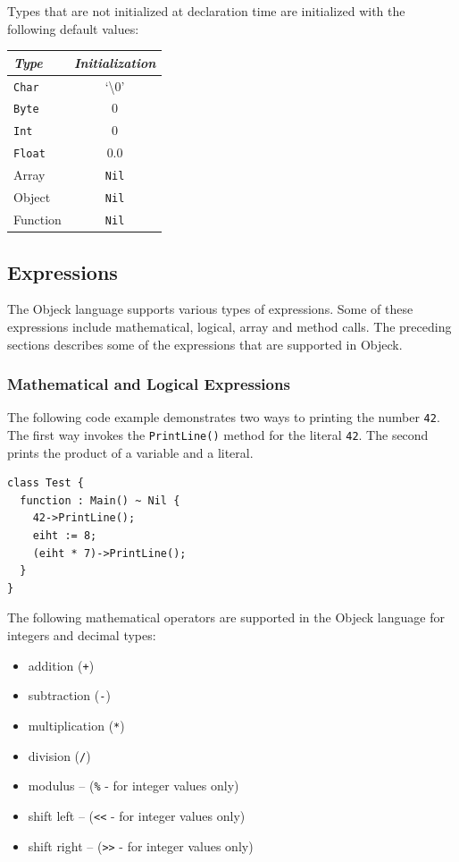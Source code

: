 \documentclass[11pt]{article}
\begin{document}
Types that are not initialized at declaration time are initialized
with the following default values:

\vspace{\baselineskip}
\begin{center}
  \begin{tabular}{| l | c |}
    \hline
    \emph{Type} & \emph{Initialization} \\ \hline \hline
    \texttt{Char} & `\textbackslash0' \\ \hline
    \texttt{Byte} & 0 \\ \hline
    \texttt{Int} & 0 \\ \hline
    \texttt{Float} & 0.0 \\ \hline
    Array & \texttt{Nil} \\ \hline
    Object & \texttt{Nil} \\ \hline
    Function & \texttt{Nil} \\ \hline
  \end{tabular}
\end{center}

\subsection{Expressions}
The Objeck language supports various types of expressions.  Some of
these expressions include mathematical, logical, array and method
calls.  The preceding sections describes some of the expressions that
are supported in Objeck.

\subsubsection{Mathematical and Logical Expressions}
The following code example demonstrates two ways to printing the
number \texttt{42}.  The first way invokes the \texttt{PrintLine()}
method for the literal \texttt{42}.  The second prints the product of
a variable and a literal.

\begin{verbatim}
class Test {
  function : Main() ~ Nil {
    42->PrintLine();
    eiht := 8;
    (eiht * 7)->PrintLine();
  }
}
\end{verbatim}

The following mathematical operators are supported in the Objeck
language for integers and decimal types:
\begin{itemize}
\item addition (\texttt{+})
\item subtraction (\texttt{-})
\item multiplication (\texttt{*})
\item division (\texttt{/})
\item modulus -- (\texttt{\%} - for integer values only)
\item shift left -- (\texttt{<<} - for integer values only)
\item shift right -- (\texttt{>>} - for integer values only)
\end{itemize}
\end{document}
